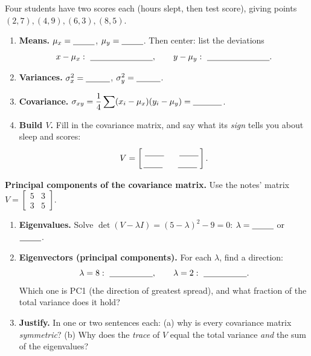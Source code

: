 \documentclass[10pt]{article}
\begin{document}
\begin{tcolorbox}[colback=white, colframe=black!40, title=\textbf{Tier A --- Approaching Proficiency},
    fonttitle=\bfseries, arc=1.5mm, left=3mm, right=3mm, top=2mm, bottom=2mm, breakable]
Four students have two scores each (hours slept, then test score), giving points
$(2,7),(4,9),(6,3),(8,5)$.
\begin{enumerate}[leftmargin=1.7em, itemsep=9pt]
  \item \textbf{Means.} $\mu_x=\blank{0.9cm}$, \quad $\mu_y=\blank{0.9cm}$. Then center: list the deviations
        \[ x-\mu_x:\ \blank{2.6cm}, \qquad y-\mu_y:\ \blank{2.6cm}. \]
  \item \textbf{Variances.} $\sigma_x^2=\blank{1.0cm}$, \quad $\sigma_y^2=\blank{1.0cm}$.
  \item \textbf{Covariance.} $\sigma_{xy}=\dfrac{1}{4}\displaystyle\sum (x_i-\mu_x)(y_i-\mu_y)=\blank{1.2cm}$.
  \item \textbf{Build $V$.} Fill in the covariance matrix, and say what its \emph{sign} tells you about sleep and scores:
        \[ V=\begin{bmatrix}\ \blank{0.8cm}\ &\ \blank{0.8cm}\ \\[2pt] \blank{0.8cm}\ &\ \blank{0.8cm}\ \end{bmatrix}. \]
        \writeline
\end{enumerate}
\end{tcolorbox}

\begin{tcolorbox}[colback=white, colframe=black!40, title=\textbf{Tier E --- Extension},
    fonttitle=\bfseries, arc=1.5mm, left=3mm, right=3mm, top=2mm, bottom=2mm, breakable]
\textbf{Principal components of the covariance matrix.} Use the notes' matrix
$V=\left[\begin{smallmatrix}5&3\\3&5\end{smallmatrix}\right]$.
\begin{enumerate}[leftmargin=1.7em, itemsep=9pt]
  \item \textbf{Eigenvalues.} Solve $\det(V-\lambda I)=(5-\lambda)^2-9=0$: \quad $\lambda=\blank{0.9cm}$ or $\blank{0.9cm}$.
  \item \textbf{Eigenvectors (principal components).} For each $\lambda$, find a direction:
        \[ \lambda=8:\ \blank{1.8cm}, \qquad \lambda=2:\ \blank{1.8cm}. \]
        Which one is PC1 (the direction of greatest spread), and what fraction of the total variance does it hold? \writeline
  \item \textbf{Justify.} In one or two sentences each: (a) why is every covariance matrix \emph{symmetric}?
        (b) Why does the \emph{trace} of $V$ equal the total variance \emph{and} the sum of the eigenvalues? \writeline
\end{enumerate}
\end{tcolorbox}
\end{document}
